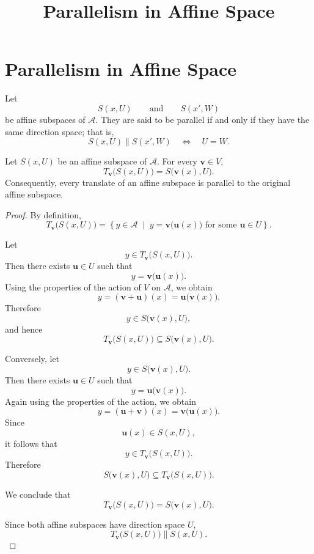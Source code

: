 \documentclass[12pt]{article}
\title{Parallelism in Affine Space}
\author{}
\date{}
\begin{document}
\maketitle

\section{Parallelism in Affine Space}

\begin{definition}
Let
\[
S(x,U)
\qquad\text{and}\qquad
S(x',W)
\]
be affine subspaces of \(\mathcal A\). They are said to be parallel if and only if
they have the same direction space; that is,
\[
S(x,U)\parallel S(x',W)
\quad\Longleftrightarrow\quad
U=W.
\]
\end{definition}

\begin{proposition}
Let \(S(x,U)\) be an affine subspace of \(\mathcal A\). For every
\(\mathbf v\in V\),
\[
T_{\mathbf v}\bigl(S(x,U)\bigr)
=
S\bigl(\mathbf v(x),U\bigr).
\]
Consequently, every translate of an affine subspace is parallel to the
original affine subspace.
\end{proposition}

\begin{proof}
By definition,
\[
T_{\mathbf v}\bigl(S(x,U)\bigr)
=
\left\{
y\in \mathcal A
\;\middle|\;
y=\mathbf v\bigl(\mathbf u(x)\bigr)
\text{ for some }\mathbf u\in U
\right\}.
\]

Let
\[
y\in T_{\mathbf v}\bigl(S(x,U)\bigr).
\]
Then there exists \(\mathbf u\in U\) such that
\[
y=\mathbf v\bigl(\mathbf u(x)\bigr).
\]
Using the properties of the action of \(V\) on \(\mathcal A\), we obtain
\[
y
=
(\mathbf v+\mathbf u)(x)
=
\mathbf u\bigl(\mathbf v(x)\bigr).
\]
Therefore
\[
y\in S\bigl(\mathbf v(x),U\bigr),
\]
and hence
\[
T_{\mathbf v}\bigl(S(x,U)\bigr)
\subseteq
S\bigl(\mathbf v(x),U\bigr).
\]

Conversely, let
\[
y\in S\bigl(\mathbf v(x),U\bigr).
\]
Then there exists \(\mathbf u\in U\) such that
\[
y=\mathbf u\bigl(\mathbf v(x)\bigr).
\]
Again using the properties of the action, we obtain
\[
y
=
(\mathbf u+\mathbf v)(x)
=
\mathbf v\bigl(\mathbf u(x)\bigr).
\]
Since
\[
\mathbf u(x)\in S(x,U),
\]
it follows that
\[
y\in T_{\mathbf v}\bigl(S(x,U)\bigr).
\]
Therefore
\[
S\bigl(\mathbf v(x),U\bigr)
\subseteq
T_{\mathbf v}\bigl(S(x,U)\bigr).
\]

We conclude that
\[
T_{\mathbf v}\bigl(S(x,U)\bigr)
=
S\bigl(\mathbf v(x),U\bigr).
\]

Since both affine subspaces have direction space \(U\),
\[
T_{\mathbf v}\bigl(S(x,U)\bigr)
\parallel
S(x,U).
\]
\end{proof}
\end{document}
